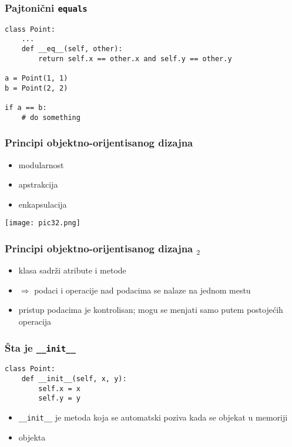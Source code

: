 \documentclass[utf8,compress,aspectratio=169]{beamer}
\begin{document}
\begin{frame}[fragile]
  \frametitle{Pajtonični \texttt{equals}}
\begin{verbatim}
class Point:
    ...
    def __eq__(self, other):
        return self.x == other.x and self.y == other.y

a = Point(1, 1)
b = Point(2, 2)

if a == b:
    # do something
\end{verbatim}
\end{frame}

\begin{frame}[fragile]
  \frametitle{Principi objektno-orijentisanog dizajna}
  \begin{itemize}
    \item modularnost
    \item apstrakcija
    \item enkapsulacija
  \end{itemize}
\begin{center}
  \texttt{[image: pic32.png]}
\end{center}
\end{frame}

\begin{frame}[fragile]
  \frametitle{Principi objektno-orijentisanog dizajna $_2$}
  \begin{itemize}
    \item klasa sadrži atribute i metode
    \item $\Rightarrow$ podaci i operacije nad podacima se nalaze na jednom mestu
    \item pristup podacima je kontrolisan; mogu se menjati samo putem postojećih operacija
  \end{itemize}
\end{frame}

\begin{frame}[fragile]
  \frametitle{Šta je \texttt{\_\_init\_\_}}
\begin{verbatim}
class Point:
    def __init__(self, x, y):
        self.x = x
        self.y = y
\end{verbatim}
  \begin{itemize}
    \item \texttt{\_\_init\_\_} je metoda koja se automatski poziva kada se objekat  u memoriji
    \item {} objekta
  \end{itemize}
\end{frame}
\end{document}
